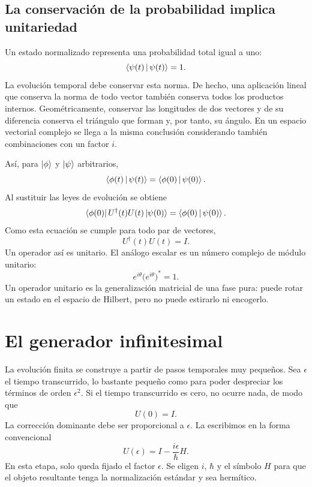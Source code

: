 \subsection{La conservación de la probabilidad implica unitariedad}

Un estado normalizado representa una probabilidad total igual a uno:
\begin{equation}
\left\langle\psi(t)\,\middle|\,\psi(t)\right\rangle=1.
\end{equation}
La evolución temporal debe conservar esta norma. De hecho, una aplicación lineal que conserva la norma de todo vector también conserva todos los productos internos. Geométricamente, conservar las longitudes de dos vectores y de su diferencia conserva el triángulo que forman y, por tanto, su ángulo. En un espacio vectorial complejo se llega a la misma conclusión considerando también combinaciones con un factor \(i\).

Así, para \(\left\lvert\phi\right\rangle\) y \(\left\lvert\psi\right\rangle\) arbitrarios,
\begin{equation}
\left\langle\phi(t)\,\middle|\,\psi(t)\right\rangle
=
\left\langle\phi(0)\,\middle|\,\psi(0)\right\rangle.
\end{equation}
Al sustituir las leyes de evolución se obtiene
\begin{equation}
\left\langle\phi(0)\right\rvert U^\dagger(t)U(t)\left\lvert\psi(0)\right\rangle
=
\left\langle\phi(0)\,\middle|\,\psi(0)\right\rangle.
\end{equation}
Como esta ecuación se cumple para todo par de vectores,
\begin{equation}
\boxed{U^\dagger(t)U(t)=I}.
\end{equation}
Un operador así es unitario. El análogo escalar es un número complejo de módulo unitario:
\begin{equation}
e^{i\theta}\bigl(e^{i\theta}\bigr)^*=1.
\end{equation}
Un operador unitario es la generalización matricial de una fase pura: puede rotar un estado en el espacio de Hilbert, pero no puede estirarlo ni encogerlo.

\section{El generador infinitesimal}

La evolución finita se construye a partir de pasos temporales muy pequeños. Sea \(\epsilon\) el tiempo transcurrido, lo bastante pequeño como para poder despreciar los términos de orden \(\epsilon^2\). Si el tiempo transcurrido es cero, no ocurre nada, de modo que
\begin{equation}
U(0)=I.
\end{equation}
La corrección dominante debe ser proporcional a \(\epsilon\). La escribimos en la forma convencional
\begin{equation}
\boxed{U(\epsilon)=I-\frac{i\epsilon}{\hbar}H}.
\end{equation}
En esta etapa, solo queda fijado el factor \(\epsilon\). Se eligen \(i\), \(\hbar\) y el símbolo \(H\) para que el objeto resultante tenga la normalización estándar y sea hermítico.


